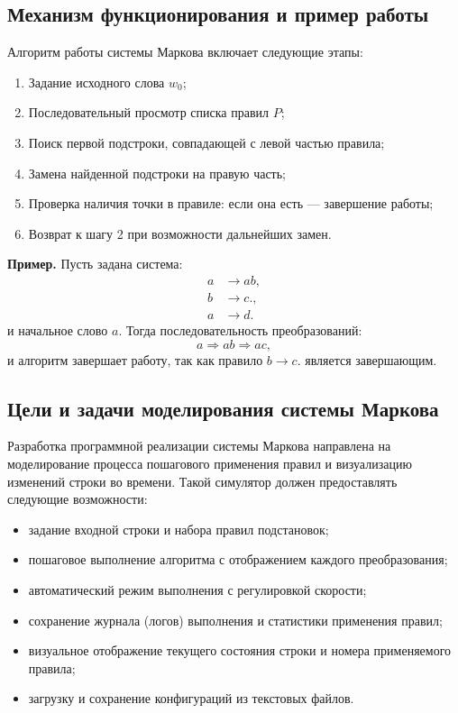 \subsection{Механизм функционирования и пример работы}

Алгоритм работы системы Маркова включает следующие этапы:
\begin{enumerate}
	\item Задание исходного слова \(w_0\);
	\item Последовательный просмотр списка правил \(P\);
	\item Поиск первой подстроки, совпадающей с левой частью правила;
	\item Замена найденной подстроки на правую часть;
	\item Проверка наличия точки в правиле: если она есть — завершение работы;
	\item Возврат к шагу 2 при возможности дальнейших замен.
\end{enumerate}

\textbf{Пример.} Пусть задана система:
\[
\begin{aligned}
	a &\rightarrow ab,\\
	b &\rightarrow c.,\\
	a &\rightarrow d.
\end{aligned}
\]
и начальное слово \(a\). Тогда последовательность преобразований:
\[
a \Rightarrow ab \Rightarrow ac,
\]
и алгоритм завершает работу, так как правило \(b \rightarrow c.\) является завершающим.

\subsection{Цели и задачи моделирования системы Маркова}

Разработка программной реализации системы Маркова направлена на моделирование процесса пошагового применения правил и визуализацию изменений строки во времени.  
Такой симулятор должен предоставлять следующие возможности:
\begin{itemize}
	\item задание входной строки и набора правил подстановок;
	\item пошаговое выполнение алгоритма с отображением каждого преобразования;
	\item автоматический режим выполнения с регулировкой скорости;
	\item сохранение журнала (логов) выполнения и статистики применения правил;
	\item визуальное отображение текущего состояния строки и номера применяемого правила;
	\item загрузку и сохранение конфигураций из текстовых файлов.
\end{itemize}

